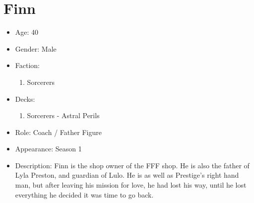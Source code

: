 \section{Finn}
\begin{itemize}
	\item Age: 40
	\item Gender: Male
	\item Faction:
	      \begin{enumerate}
		      \item Sorcerers
	      \end{enumerate}
	\item Decks:
	      \begin{enumerate}
		      \item Sorcerers - Astral Perils
	      \end{enumerate}
	\item Role: Coach / Father Figure
	\item Appearance: Season 1
	\item Description: Finn is the shop owner of the FFF shop. He is
	      also the father of Lyla Preston, and guardian of Lulo. He is as well
	      as Prestige's right hand man, but after leaving his mission for love, he
	      had lost his way, until he lost everything he decided it was time to go back.
\end{itemize}
\newpage